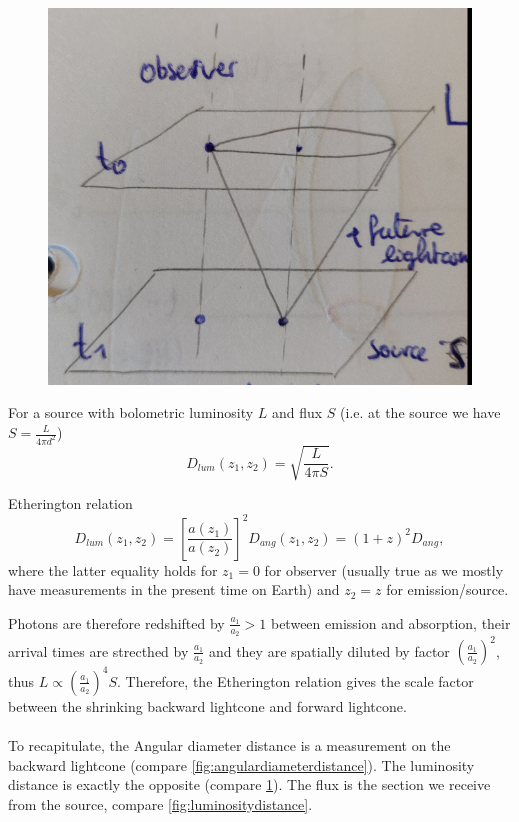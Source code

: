 \begin{figure}[h!]
	\centering
	\includegraphics[width=0.7\linewidth]{gfx/AngulardiameterDistance1}
	\caption{}
	\label{fig:lumininositydistance1}
\end{figure}
For a source with bolometric luminosity $L$ and flux $S$ (i.e. at the source we have $S=\frac{L}{4 \pi d^2}$)
\begin{equation}
	D_{lum}(z_1,z_2) = \sqrt{\frac{L}{4 \pi S}}.
\end{equation}
\begin{mybox}{Etherington relation}
\begin{equation}
	D_{lum}(z_1,z_2) = \left[\frac{a(z_1)}{a(z_2)}\right]^2 D_{ang}(z_1,z_2) = (1+z)^2 D_{ang},
\end{equation}
where the latter equality holds for $z_1=0$ for observer (usually true as we mostly have measurements in the present time on Earth) and $z_2=z$ for emission/source.
\end{mybox}
Photons are therefore redshifted by $\frac{a_1}{a_2} >1$ between emission and absorption, their arrival times are strecthed by $\frac{a_1}{a_2}$ and they are spatially diluted by factor $\left(\frac{a_1}{a_2}\right)^2$, thus $L\propto \left(\frac{a_1}{a_2}\right)^4 S$. Therefore, the Etherington relation gives the scale factor between the shrinking backward lightcone and forward lightcone.
\\
\\
To recapitulate, the Angular diameter distance is a measurement on the backward lightcone (compare \ref{fig:angulardiameterdistance}). The luminosity distance is exactly the opposite (compare \ref{fig:lumininositydistance1}). The flux is the section we receive from the source, compare \ref{fig:luminositydistance}.
